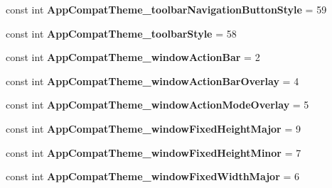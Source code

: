 \begin{DoxyCompactItemize}
const int {\bfseries App\+Compat\+Theme\+\_\+toolbar\+Navigation\+Button\+Style} = 59
\item 
\mbox{\label{class_pinned_app_1_1_droid_1_1_resource_1_1_styleable_aa37b1e3c86caefb71dc20b1856476800}} 
const int {\bfseries App\+Compat\+Theme\+\_\+toolbar\+Style} = 58
\item 
\mbox{\label{class_pinned_app_1_1_droid_1_1_resource_1_1_styleable_a2b83124df1509142698f02445dff5ee4}} 
const int {\bfseries App\+Compat\+Theme\+\_\+window\+Action\+Bar} = 2
\item 
\mbox{\label{class_pinned_app_1_1_droid_1_1_resource_1_1_styleable_a1e3355b441bd34297e3425f96db9cd5d}} 
const int {\bfseries App\+Compat\+Theme\+\_\+window\+Action\+Bar\+Overlay} = 4
\item 
\mbox{\label{class_pinned_app_1_1_droid_1_1_resource_1_1_styleable_a9919ec6d79ef53c4853ca43dac6aa9cc}} 
const int {\bfseries App\+Compat\+Theme\+\_\+window\+Action\+Mode\+Overlay} = 5
\item 
\mbox{\label{class_pinned_app_1_1_droid_1_1_resource_1_1_styleable_a11eb7adad4d407eb480beef36f844120}} 
const int {\bfseries App\+Compat\+Theme\+\_\+window\+Fixed\+Height\+Major} = 9
\item 
\mbox{\label{class_pinned_app_1_1_droid_1_1_resource_1_1_styleable_afa4d04f9d29d8fb9f1c71c49f3c4b0f9}} 
const int {\bfseries App\+Compat\+Theme\+\_\+window\+Fixed\+Height\+Minor} = 7
\item 
\mbox{\label{class_pinned_app_1_1_droid_1_1_resource_1_1_styleable_a0c085b8d072ddeb2443c33d7db2d757d}} 
const int {\bfseries App\+Compat\+Theme\+\_\+window\+Fixed\+Width\+Major} = 6
\item 
\mbox{\label{class_pinned_app_1_1_droid_1_1_resource_1_1_styleable_ae9f396481a4f6fc5d94561502a731e3f}} 

\end{DoxyCompactItemize}

